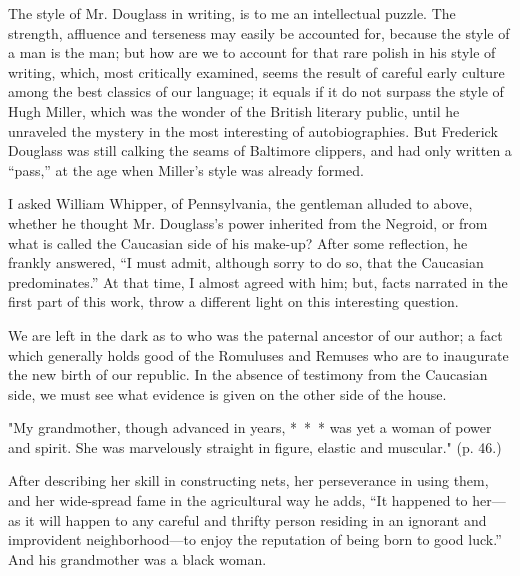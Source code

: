 The style of Mr. Douglass in writing, is to me an intellectual puzzle.
The strength, affluence and terseness may easily be accounted for,
because the style of a man is the man; but how are we to account for
that rare polish in his style of writing, which, most critically
examined, seems the result of careful early culture among the best
classics of our language; it equals if it do not surpass the style of
Hugh Miller, which was the wonder of the British literary public, until
he unraveled the mystery in the most interesting of autobiographies. But
Frederick Douglass was still calking the seams of Baltimore clippers,
and had only written a ``pass,'' at the age when Miller's style was
already formed.

I asked William Whipper, of Pennsylvania, the gentleman alluded to
above, whether he thought Mr. Douglass's power inherited from the
Negroid, or from what is called the Caucasian side of his make-up? After
some reflection, he frankly answered, ``I must admit, although sorry to
do so, that the Caucasian predominates.'' At that time, I almost agreed
with him; but, facts narrated in the first part of this work, throw a
different light on this interesting question.

We are left in the dark as to who was the paternal ancestor of our
author; a fact which generally holds good of the Romuluses and Remuses
who are to inaugurate the new birth of our republic. In the absence of
testimony from the Caucasian side, we must see what evidence is given on
the other side of the house.

"My grandmother, though advanced in years, {*~*~*} was yet a woman of
power and spirit. She was marvelously straight in figure, elastic and
muscular." (p. 46.)

After describing her skill in constructing nets, her perseverance in
using them, and her wide-spread fame in the agricultural way
{\protect\hypertarget{xxx}{}{}}he adds, ``It happened to her---as it
will happen to any careful and thrifty person residing in an ignorant
and improvident neighborhood---to enjoy the reputation of being born to
good luck.'' And his grandmother was a black woman.

